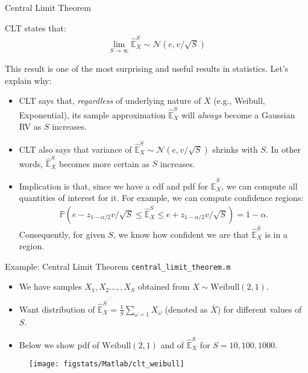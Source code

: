 \documentclass[9pt]{beamer}
\begin{document}
%
\begin{frame}{Central Limit Theorem}

\begin{block}{}
CLT states that:
\begin{align*}
\lim_{S\to \infty}\hat{\mathbb{E}}_X^S\sim \mathcal{N}(e,v/\sqrt{S})
\end{align*}
\end{block}

This result is one of the most surprising and useful results in statistics. Let's explain why:

\begin{itemize}
\setlength{\itemsep}{10pt}
\item CLT says that, {\em regardless} of underlying nature of $X$ (e.g., Weibull, Exponential), its sample approximation $\hat{\mathbb{E}}_X^S$ will {\em always} become a Gaussian RV as $S$ increases.  

\item CLT also says that variance of $\hat{\mathbb{E}}_X^S\sim \mathcal{N}(e,v/\sqrt{S})$ shrinks with $S$. In other words, $\hat{\mathbb{E}}_X^S$ becomes more certain as $S$ increases.

\item Implication is that, since we have a cdf and pdf for $\hat{\mathbb{E}}_X^S$, we can compute all quantities of interest for it. For example, we can compute confidence regions:
\begin{align*}
\mathbb{P}\left(e-z_{1-\alpha/2}v/\sqrt{S}\leq \hat{\mathbb{E}}_X^S\leq e+z_{1-\alpha/2}v/\sqrt{S}\right)=1-\alpha.
\end{align*}
Consequently, for given $S$, we know how confident we are that $\hat{\mathbb{E}}_X^S$ is in a region.  

\end{itemize}


\end{frame}

%
\begin{frame}{Example: Central Limit Theorem \footnotesize{\texttt{central\_limit\_theorem.m}}}

\begin{itemize}
\setlength{\itemsep}{5pt}
\item We have samples $X_1,X_2...,,X_S$ obtained from $X\sim \textrm{Weibull}(2,1)$.
\item Want distribution of $\hat{\mathbb{E}}_X^S=\frac{1}{S}\sum_{\omega=1}X_\omega$ (denoted as $\bar{X}$) for different values of $S$.
\item Below we show pdf of $\textrm{Weibull}(2,1)$ and of $\hat{\mathbb{E}}_X^S$ for $S=10,100,1000$.
\end{itemize}
\begin{figure}[!htb]
    \centering
	\texttt{[image: figstats/Matlab/clt\_weibull]}
\end{figure}
\end{frame}
\end{document}
